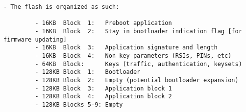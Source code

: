 \documentclass{article}
\begin{document}
\begin{Verbatim}[fontsize=\small,highlightcolor=lightgray,highlightlines={5,38,58,78}]
    - The flash is organized as such:

         - 16KB  Block  1:   Preboot application
         - 16KB  Block  2:   Stay in bootloader indication flag [for firmware updating]
         - 16KB  Block  3:   Application signature and length
         - 16KB  Block  4:   Non-key parameters (RSIs, PINs, etc)
         - 64KB  Block:      Keys (traffic, authentication, keysets)
         - 128KB Block  1:   Bootloader
         - 128KB Block  2:   Empty (potential bootloader expansion)
         - 128KB Block  3:   Application block 1
         - 128KB Block  4:   Application block 2
         - 128KB Blocks 5-9: Empty


\end{Verbatim}
\end{document}
